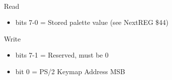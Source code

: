 \\
Read
\begin{itemize}
\item bits 7-0 = Stored palette value (see NextREG \$44)
\end{itemize}
Write  
\begin{itemize}
\item bits 7-1 = Reserved, must be 0
\item bit 0 = PS/2 Keymap Address MSB
\end{itemize}

